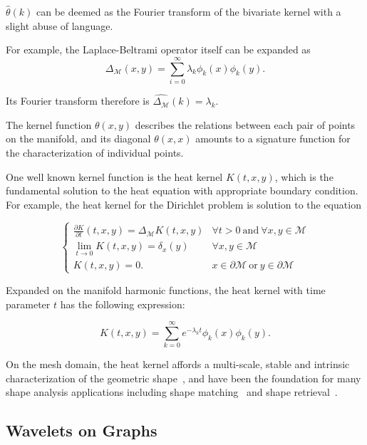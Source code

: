 $\hat{\theta}(k)$ can be deemed as the Fourier transform of the bivariate kernel
with a slight abuse of language.

For example, the Laplace-Beltrami operator itself can be expanded as
\begin{equation}
\Delta_\mathcal{M}(x,y)=\sum_{i=0}^\infty \lambda_k\phi_k(x)\phi_k(y).
\end{equation}

Its Fourier transform therefore is $\widehat{\Delta_\mathcal{M}}(k)=\lambda_k$.

The kernel function $\theta(x,y)$ describes the relations between each pair of
points on the manifold, and its diagonal $\theta(x,x)$ amounts to a
signature function for the characterization of individual points.

One well known kernel function is the heat kernel $K(t,x,y)$, which is
the fundamental solution to the heat equation with appropriate boundary condition.
For example, the heat kernel for the Dirichlet problem is solution to the equation

\begin{equation}
\left\{
  \begin{array}{ll}
    \frac{\partial K}{\partial t}(t,x,y) = \Delta_{\mathcal{M}} K(t,x,y) &\forall t>0 ~\text{and}~ \forall x,y\in\mathcal{M}\\
    \lim_{t\rightarrow 0}K(t,x,y)=\delta_x(y) &\forall x,y\in\mathcal{M} \\
    K(t,x,y)=0. & x\in\partial\mathcal{M} ~\text{or}~ y\in\partial\mathcal{M}
  \end{array}
\right.
\end{equation}

Expanded on the manifold harmonic functions, the heat kernel with time parameter
$t$ has the following expression:

\begin{equation}
K(t,x,y)=\sum_{k=0}^{\infty} e^{-\lambda_k t} \phi_k(x)\phi_k(y).
\end{equation}

On the mesh domain, the heat kernel affords a multi-scale, stable and intrinsic
characterization of the geometric shape~\cite{Sun:2009:CGF}, and have been
the foundation for many shape analysis applications including shape matching~\cite{Ovsjanikov2010}
and shape retrieval~\cite{Bronstein2011}.


\subsection{Wavelets on Graphs}

